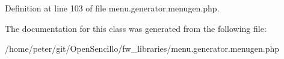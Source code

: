 Definition at line 103 of file menu.\-generator.\-menugen.\-php.



The documentation for this class was generated from the following file\-:\begin{DoxyCompactItemize}
\item 
/home/peter/git/\-Open\-Sencillo/fw\-\_\-libraries/menu.\-generator.\-menugen.\-php\end{DoxyCompactItemize}
